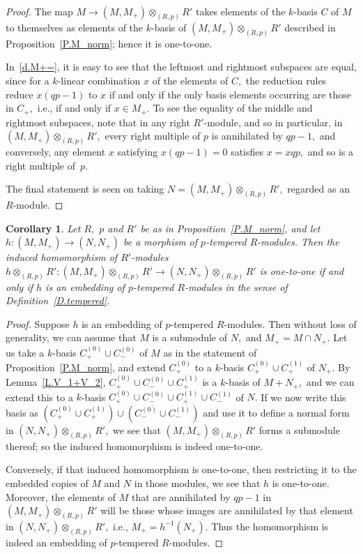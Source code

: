 \documentclass{amsart}
\newtheorem{corollary}[theorem]{Corollary}
\begin{document}
\begin{proof}
The map $M\to(M,M_+)\otimes_{(R,p)} R'$ takes elements of
the $\!k\!$-basis $C$ of $M$ to themselves as elements
of the $\!k\!$-basis of $(M,M_+)\otimes_{(R,p)} R'$
described in Proposition~\ref{P.M_norm}; hence it is one-to-one.

In~\eqref{d.M+=}, it is easy to see that the leftmost
and rightmost subspaces are
equal, since for a $\!k\!$-linear combination $x$ of the elements
of $C,$ the reduction rules reduce $x(qp-1)$ to $x$ if and
only if the only basis elements occurring are those in $C_+,$
i.e., if and only if $x\in M_+.$
To see the equality of the middle and rightmost subspaces, note
that in any right $\!R'\!$-module, and so in particular, in
$(M,M_+)\otimes_{(R,p)} R',$ every right multiple of $p$ is
annihilated by $qp-1,$ and conversely, any element $x$
satisfying $x(qp-1)=0$ satisfies $x=xqp,$ and so is a right
multiple of~$p.$

The final statement is seen on taking $N=(M,M_+)\otimes_{(R,p)} R',$
regarded as an $\!R\!$-module.
\end{proof}

\begin{corollary}\label{C.MinN}
Let $R,$ $p$ and $R'$ be as in Proposition~\ref{P.M_norm},
and let $h:(M,M_+)\to(N,N_+)$ be a morphism of $\!p\!$-tempered
$\!R\!$-modules.
Then the induced homomorphism of $\!R'\!$-modules $h\otimes_{(R,p)}R':
(M,M_+)\otimes_{(R,p)} R'\to (N,N_+)\otimes_{(R,p)} R'$
is one-to-one if and only if $h$ is
an embedding of $\!p\!$-tempered $\!R\!$-modules
in the sense of Definition~\ref{D.tempered}.
\end{corollary}

\begin{proof}
Suppose $h$ is an embedding of $\!p\!$-tempered $\!R\!$-modules.
Then without loss of generality, we can assume that $M$ is
a submodule of $N,$ and $M_+=M\cap N_+.$
Let us take a $\!k\!$-basis $C^{(0)}_+\cup C^{(0)}_-$ of $M$ as in
the statement of Proposition~\ref{P.M_norm}, and extend $C^{(0)}_+$
to a $\!k\!$-basis $C^{(0)}_+\cup C^{(1)}_+$ of $N_+.$
By Lemma~\ref{L.V_1+V_2}, $C^{(0)}_+\cup C^{(0)}_- \cup C^{(1)}_+$ is
a $\!k\!$-basis of $M+N_+,$ and we can extend this to a $\!k\!$-basis
$C^{(0)}_+\cup C^{(0)}_- \cup C^{(1)}_+\cup C^{(1)}_-$ of $N.$
If we now write this basis as
$(C^{(0)}_+\cup C^{(1)}_+)\cup(C^{(0)}_-\cup C^{(1)}_-)$ and
use it to define a normal form in $(N,N_+)\otimes_{(R,p)} R',$
we see that $(M,M_+)\otimes_{(R,p)} R'$ forms a submodule thereof;
so the induced homomorphism is indeed one-to-one.

Conversely, if that induced homomorphism is one-to-one,
then restricting it to the embedded copies of $M$ and $N$
in those modules, we see that $h$ is one-to-one.
Moreover, the elements of $M$ that are annihilated by $qp-1$
in $(M,M_+)\otimes_{(R,p)} R'$ will be those whose images
are annihilated by that element in $(N,N_+)\otimes_{(R,p)} R',$
i.e., $M_+=h^{-1}(N_+).$
Thus the homomorphism is
indeed an embedding of $\!p\!$-tempered $\!R\!$-modules.
\end{proof}
\end{document}
